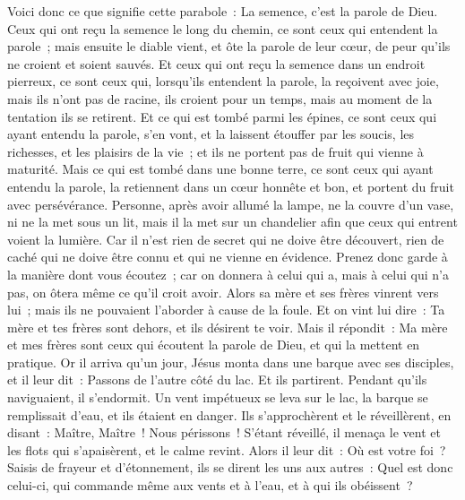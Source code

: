 \begin{multicols}{2}
Voici donc ce que signifie cette parabole~: La semence, c'est la parole de Dieu.
Ceux qui ont reçu la semence le long du chemin, ce sont ceux qui entendent la parole~; mais ensuite le diable vient, et ôte la parole de leur cœur, de peur qu'ils ne croient et soient sauvés.
Et ceux qui ont reçu la semence dans un endroit pierreux, ce sont ceux qui, lorsqu'ils entendent la parole, la reçoivent avec joie, mais ils n'ont pas de racine, ils croient pour un temps, mais au moment de la tentation ils se retirent.
Et ce qui est tombé parmi les épines, ce sont ceux qui ayant entendu la parole, s'en vont, et la laissent étouffer par les soucis, les richesses, et les plaisirs de la vie~; et ils ne portent pas de fruit qui vienne à maturité.
Mais ce qui est tombé dans une bonne terre, ce sont ceux qui ayant entendu la parole, la retiennent dans un cœur honnête et bon, et portent du fruit avec persévérance.
Personne, après avoir allumé la lampe, ne la couvre d'un vase, ni ne la met sous un lit, mais il la met sur un chandelier afin que ceux qui entrent voient la lumière.
Car il n'est rien de secret qui ne doive être découvert, rien de caché qui ne doive être connu et qui ne vienne en évidence.
Prenez donc garde à la manière dont vous écoutez~; car on donnera à celui qui a, mais à celui qui n'a pas, on ôtera même ce qu'il croit avoir.
Alors sa mère et ses frères vinrent vers lui~; mais ils ne pouvaient l'aborder à cause de la foule.
Et on vint lui dire~: Ta mère et tes frères sont dehors, et ils désirent te voir.
Mais il répondit~: Ma mère et mes frères sont ceux qui écoutent la parole de Dieu, et qui la mettent en pratique.
Or il arriva qu'un jour, Jésus monta dans une barque avec ses disciples, et il leur dit~: Passons de l'autre côté du lac. Et ils partirent.
Pendant qu'ils naviguaient, il s'endormit. Un vent impétueux se leva sur le lac, la barque se remplissait d'eau, et ils étaient en danger.
Ils s'approchèrent et le réveillèrent, en disant~: Maître, Maître~! Nous périssons~! S'étant réveillé, il menaça le vent et les flots qui s'apaisèrent, et le calme revint.
Alors il leur dit~: Où est votre foi~? Saisis de frayeur et d'étonnement, ils se dirent les uns aux autres~: Quel est donc celui-ci, qui commande même aux vents et à l'eau, et à qui ils obéissent~?

\end{multicols}
